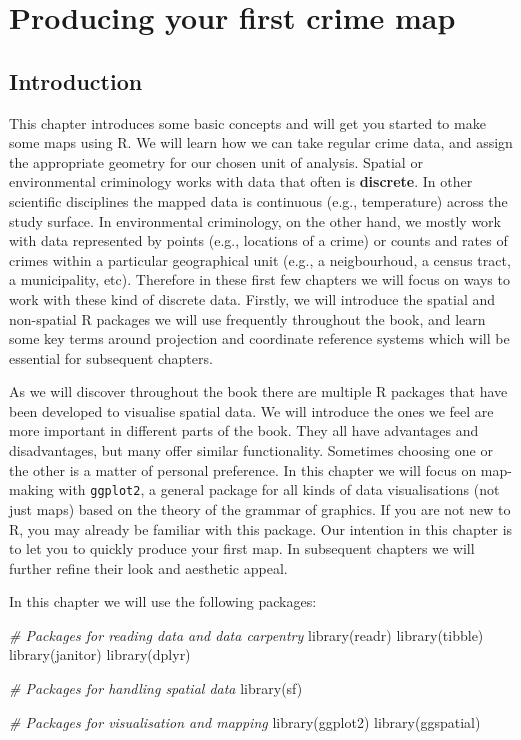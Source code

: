 \documentclass[
]{book}
\newenvironment{Shaded}{\begin{snugshade}}{\end{snugshade}}
\newcommand{\CommentTok}[1]{\textcolor[rgb]{0.56,0.35,0.01}{\textit{#1}}}
\newcommand{\FunctionTok}[1]{\textcolor[rgb]{0.00,0.00,0.00}{#1}}
\newcommand{\NormalTok}[1]{#1}
\begin{document}
\hypertarget{producing-your-first-crime-map}{%
\chapter{Producing your first crime map}\label{producing-your-first-crime-map}}

\hypertarget{introduction}{%
\section{Introduction}\label{introduction}}

This chapter introduces some basic concepts and will get you started to make some maps using R. We will learn how we can take regular crime data, and assign the appropriate geometry for our chosen unit of analysis. Spatial or environmental criminology works with data that often is \textbf{discrete}. In other scientific disciplines the mapped data is continuous (e.g., temperature) across the study surface. In environmental criminology, on the other hand, we mostly work with data represented by points (e.g., locations of a crime) or counts and rates of crimes within a particular geographical unit (e.g., a neigbourhoud, a census tract, a municipality, etc). Therefore in these first few chapters we will focus on ways to work with these kind of discrete data. Firstly, we will introduce the spatial and non-spatial R packages we will use frequently throughout the book, and learn some key terms around projection and coordinate reference systems which will be essential for subsequent chapters.

As we will discover throughout the book there are multiple R packages that have been developed to visualise spatial data. We will introduce the ones we feel are more important in different parts of the book. They all have advantages and disadvantages, but many offer similar functionality. Sometimes choosing one or the other is a matter of personal preference. In this chapter we will focus on map-making with \texttt{ggplot2}, a general package for all kinds of data visualisations (not just maps) based on the theory of the grammar of graphics. If you are not new to R, you may already be familiar with this package. Our intention in this chapter is to let you to quickly produce your first map. In subsequent chapters we will further refine their look and aesthetic appeal.

In this chapter we will use the following packages:

\begin{Shaded}
\begin{Highlighting}[]
\CommentTok{\# Packages for reading data and data carpentry}
\FunctionTok{library}\NormalTok{(readr)}
\FunctionTok{library}\NormalTok{(tibble)}
\FunctionTok{library}\NormalTok{(janitor)}
\FunctionTok{library}\NormalTok{(dplyr)}

\CommentTok{\# Packages for handling spatial data}
\FunctionTok{library}\NormalTok{(sf)}

\CommentTok{\# Packages for visualisation and mapping}
\FunctionTok{library}\NormalTok{(ggplot2)}
\FunctionTok{library}\NormalTok{(ggspatial)}
\end{Highlighting}
\end{Shaded}
\end{document}
